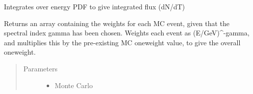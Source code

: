 \documentclass[letterpaper,10pt,english]{sphinxmanual}
\begin{document}
\begin{fulllineitems}
\begin{fulllineitems}
\end{fulllineitems}


\begin{fulllineitems}
\label{\detokenize{index:flarestack.core.energy_pdf.PowerLaw.flux_integral}}
Integrates over energy PDF to give integrated flux (dN/dT)

\end{fulllineitems}


\begin{fulllineitems}
\label{\detokenize{index:flarestack.core.energy_pdf.PowerLaw.return_energy_parameters}}
\end{fulllineitems}


\begin{fulllineitems}
\label{\detokenize{index:flarestack.core.energy_pdf.PowerLaw.return_injected_parameters}}
\end{fulllineitems}


\begin{fulllineitems}
\label{\detokenize{index:flarestack.core.energy_pdf.PowerLaw.weight_mc}}
Returns an array containing the weights for each MC event,
given that the spectral index gamma has been chosen. Weights each
event as (E/GeV)\textasciicircum{}-gamma, and multiplies this by the pre-existing MC
oneweight value, to give the overall oneweight.
\begin{quote}\begin{description}
\item[{Parameters}] \leavevmode\begin{itemize}
\item {} 
 \textendash{} Monte Carlo


\end{itemize}
\end{description}
\end{quote}
\end{fulllineitems}
\end{fulllineitems}
\end{document}
